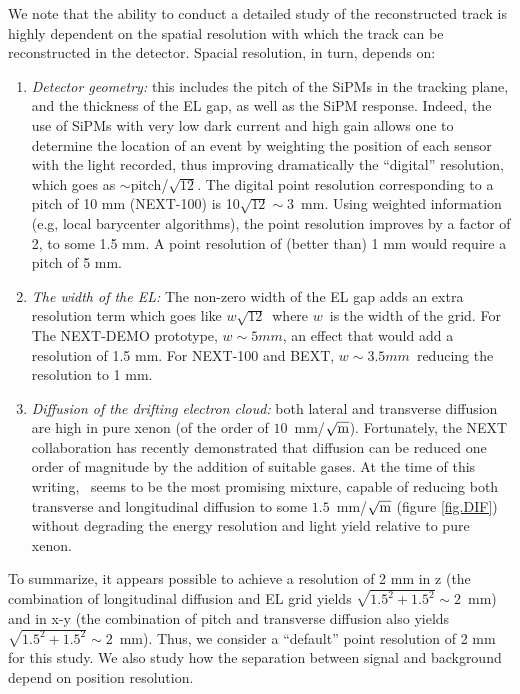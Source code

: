 \documentclass{JINST}
\begin{document}
We note that the ability to conduct a detailed study of the reconstructed track is highly dependent on the spatial resolution with which the track can be reconstructed in the detector. Spacial resolution, in turn, depends on:
\begin{enumerate}
\item {\em Detector geometry:} this includes the pitch of the SiPMs in the tracking plane, and the thickness of the EL gap, as well as the SiPM response. Indeed, the use of SiPMs with very low dark current and high gain allows one to determine the location of an event by weighting the position of each sensor with the light recorded, thus improving dramatically the ``digital'' resolution, which goes as $\sim$pitch/$\sqrt{12}$. The digital point resolution corresponding to a pitch of 10 mm (NEXT-100) is 10$\sqrt{12} \sim 3$~mm. Using weighted information (e.g, local barycenter algorithms), the point resolution improves by a factor of 2, to some 1.5 mm. A point resolution of (better than) 1 mm would require a pitch of 5 mm. 
\item {\em The width of the EL:}
The non-zero width of the EL gap adds an extra resolution term which goes like $w\sqrt{12}$~where $w$~is the width of the grid. For The NEXT-DEMO prototype, $w\sim 5 mm$, an effect that would add a resolution of 1.5 mm. For NEXT-100 and BEXT, $w\sim 3.5 mm$~reducing the resolution to 1 mm. 

\item {\em Diffusion of the drifting electron cloud:}  both lateral and transverse diffusion are high in pure xenon (of the order of $10$~mm/$\sqrt{\rm{m}}$). Fortunately, the NEXT collaboration has recently demonstrated that diffusion can be reduced one order of magnitude by the addition of suitable gases. At the time of this writing, \COT\ seems to be the most promising mixture, capable of reducing both transverse and longitudinal diffusion to some $1.5$~mm/$\sqrt{\rm{m}}$ (figure \ref{fig.DIF}) without degrading the energy resolution and light yield relative to pure xenon. 
\end{enumerate}

To summarize, it appears possible to achieve a resolution of 2 mm in z (the combination of 
longitudinal diffusion and EL grid yields $\sqrt{1.5^2+1.5^2} \sim 2$~mm) and in x-y
(the combination of pitch and transverse diffusion also yields $\sqrt{1.5^2+1.5^2} \sim 2$~mm). Thus, we
 consider a ``default'' point resolution of 2 mm for this study. We also study how the separation between signal and background depend on position resolution.
\end{document}
